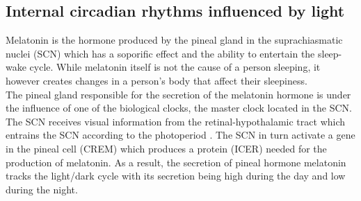 \subsection{Internal circadian rhythms influenced by light}
Melatonin is the hormone produced by the pineal gland in the suprachiasmatic nuclei (SCN) which has a soporific effect and the ability to entertain the sleep-wake cycle. While melatonin itself is not the cause of a person sleeping, it however creates changes in a person's body that affect their sleepiness. \\
The pineal gland responsible for the secretion of the melatonin hormone is under the influence of one of the biological clocks, the master clock located in the SCN. The SCN receives visual information from the retinal-hypothalamic tract which entrains the SCN according to the photoperiod \cite{lig1994}. The SCN in turn activate a gene in the pineal cell (CREM) which produces a protein (ICER) needed for the production of melatonin. As a result, the secretion of pineal hormone melatonin tracks the light/dark cycle with its  secretion being high during the day and low during the night.  

